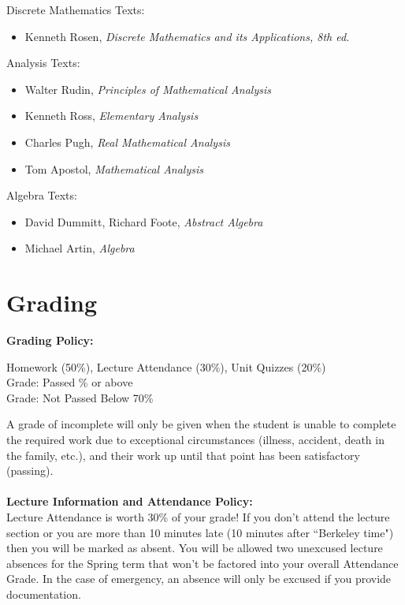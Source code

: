 \documentclass[11pt, a4paper]{article}
\begin{document}
\noindent Discrete Mathematics Texts:
\begin{itemize}
    \item Kenneth Rosen, \textit{Discrete Mathematics and its Applications, 8th ed.}
\end{itemize}

\noindent Analysis Texts:
\begin{itemize}
    \item  Walter Rudin, \textit{Principles of Mathematical Analysis}
    \item Kenneth Ross, \textit{Elementary Analysis}
    \item Charles Pugh, \textit{Real Mathematical Analysis}
    \item Tom Apostol, \textit{Mathematical Analysis}
\end{itemize}

\noindent Algebra Texts:
\begin{itemize}
    \item David Dummitt, Richard Foote, \textit{Abstract Algebra}
    \item Michael Artin, \textit{Algebra}
\end{itemize}

\section*{Grading}
\noindent\textbf{Grading Policy:} 
\begin{center}
Homework (50\%), Lecture Attendance (30\%), Unit Quizzes (20\%)  \\
Grade: Passed \% or above \\
Grade: Not Passed  \dotfill Below 70\% 
\end{center}
A grade of incomplete will only be given when the student is unable to complete the required work due to exceptional circumstances (illness, accident, death
in the family, etc.), and their work up until that point has been satisfactory (passing). 
\\ \\
\noindent\textbf{Lecture Information and Attendance Policy:}
\\
Lecture Attendance is worth 30\% of your grade! If you don't attend the lecture section or you are more than 10 minutes late (10 minutes after ``Berkeley time") then you will be marked as absent. You will be allowed two unexcused lecture absences for the Spring term that won't be factored into your overall Attendance Grade. In the case of emergency, an absence will only be excused if you provide documentation. 
\\
\end{document}
